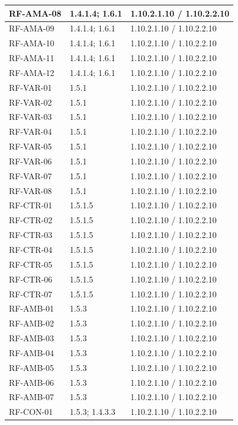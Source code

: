 \begin{longtable}{L{23mm}L{46mm}L{72mm}}
RF-AMA-08 & 1.4.1.4; 1.6.1 & 1.10.2.1.10 / 1.10.2.2.10\\\hline
RF-AMA-09 & 1.4.1.4; 1.6.1 & 1.10.2.1.10 / 1.10.2.2.10\\\hline
RF-AMA-10 & 1.4.1.4; 1.6.1 & 1.10.2.1.10 / 1.10.2.2.10\\\hline
RF-AMA-11 & 1.4.1.4; 1.6.1 & 1.10.2.1.10 / 1.10.2.2.10\\\hline
RF-AMA-12 & 1.4.1.4; 1.6.1 & 1.10.2.1.10 / 1.10.2.2.10\\\hline
RF-VAR-01 & 1.5.1 & 1.10.2.1.10 / 1.10.2.2.10\\\hline
RF-VAR-02 & 1.5.1 & 1.10.2.1.10 / 1.10.2.2.10\\\hline
RF-VAR-03 & 1.5.1 & 1.10.2.1.10 / 1.10.2.2.10\\\hline
RF-VAR-04 & 1.5.1 & 1.10.2.1.10 / 1.10.2.2.10\\\hline
RF-VAR-05 & 1.5.1 & 1.10.2.1.10 / 1.10.2.2.10\\\hline
RF-VAR-06 & 1.5.1 & 1.10.2.1.10 / 1.10.2.2.10\\\hline
RF-VAR-07 & 1.5.1 & 1.10.2.1.10 / 1.10.2.2.10\\\hline
RF-VAR-08 & 1.5.1 & 1.10.2.1.10 / 1.10.2.2.10\\\hline
RF-CTR-01 & 1.5.1.5 & 1.10.2.1.10 / 1.10.2.2.10\\\hline
RF-CTR-02 & 1.5.1.5 & 1.10.2.1.10 / 1.10.2.2.10\\\hline
RF-CTR-03 & 1.5.1.5 & 1.10.2.1.10 / 1.10.2.2.10\\\hline
RF-CTR-04 & 1.5.1.5 & 1.10.2.1.10 / 1.10.2.2.10\\\hline
RF-CTR-05 & 1.5.1.5 & 1.10.2.1.10 / 1.10.2.2.10\\\hline
RF-CTR-06 & 1.5.1.5 & 1.10.2.1.10 / 1.10.2.2.10\\\hline
RF-CTR-07 & 1.5.1.5 & 1.10.2.1.10 / 1.10.2.2.10\\\hline
RF-AMB-01 & 1.5.3 & 1.10.2.1.10 / 1.10.2.2.10\\\hline
RF-AMB-02 & 1.5.3 & 1.10.2.1.10 / 1.10.2.2.10\\\hline
RF-AMB-03 & 1.5.3 & 1.10.2.1.10 / 1.10.2.2.10\\\hline
RF-AMB-04 & 1.5.3 & 1.10.2.1.10 / 1.10.2.2.10\\\hline
RF-AMB-05 & 1.5.3 & 1.10.2.1.10 / 1.10.2.2.10\\\hline
RF-AMB-06 & 1.5.3 & 1.10.2.1.10 / 1.10.2.2.10\\\hline
RF-AMB-07 & 1.5.3 & 1.10.2.1.10 / 1.10.2.2.10\\\hline
RF-CON-01 & 1.5.3; 1.4.3.3 & 1.10.2.1.10 / 1.10.2.2.10\\\hline

\end{longtable}
